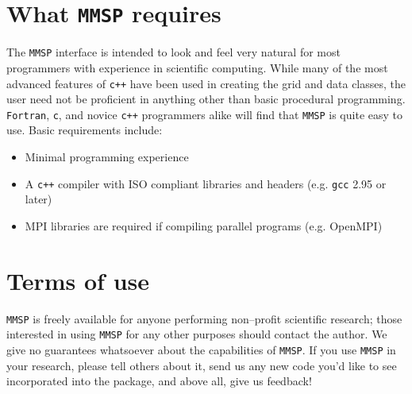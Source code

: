 \section{What {\tt MMSP} requires}
The {\tt MMSP} interface is intended to look and feel very natural for most programmers with experience in scientific computing.  While many of the most advanced features of {\tt c++} have been used in creating the grid and data classes, the user need not be proficient in anything other than basic procedural programming.  {\tt Fortran}, {\tt c}, and novice {\tt c++} programmers alike will find that {\tt MMSP} is quite easy to use.  Basic requirements include:
\begin{itemize}
\item Minimal programming experience
\item A {\tt c++} compiler with ISO compliant libraries and headers (e.g. {\tt gcc} 2.95 or later)
\item MPI libraries are required if compiling parallel programs (e.g. OpenMPI)
\end{itemize}

\section{Terms of use}
{\tt MMSP} is freely available for anyone performing non--profit scientific research; those interested in using {\tt MMSP} for any other purposes should contact the author. We give no guarantees whatsoever about the capabilities of {\tt MMSP}. If you use {\tt MMSP} in your research, please tell others about it, send us any new code you'd like to see incorporated into the package, and above all, give us feedback! 

